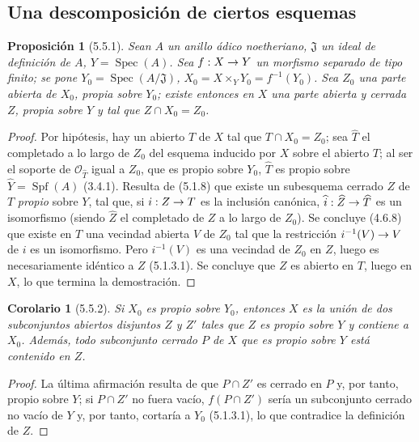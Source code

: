 \documentclass[10pt,oneside,openany]{book}
\theoremstyle{egaenv}\newtheorem*{env}{---}
\theoremstyle{egastatement}
\newtheorem*{proposition}{Proposición}
\newtheorem*{corollary}{Corolario}
\theoremstyle{egadescription}
\renewcommand{\to}{\mathchoice{\longrightarrow}{\rightarrow}{\rightarrow}{\rightarrow}}
\begin{document}
\subsection{Una descomposición de ciertos esquemas}
\label{subsection:III.5.5}
\label{subsection:III.5.5-fr}

\begin{proposition}[5.5.1]
\label{III.5.5.1-fr}
Sean $A$ un anillo ádico noetheriano, $\mathfrak J$ un ideal de definición
de $A$, $Y=\operatorname{Spec}(A)$. Sea $f:X\to Y$ un morfismo separado de
tipo finito; se pone $Y_0=\operatorname{Spec}(A/\mathfrak J)$,
$X_0=X\times_Y Y_0=f^{-1}(Y_0)$. Sea $Z_0$ una parte abierta de $X_0$,
propia sobre $Y_0$; existe entonces en $X$ una parte abierta y cerrada $Z$,
propia sobre $Y$ y tal que $Z\cap X_0=Z_0$.
\end{proposition}

\begin{proof}
Por hipótesis, hay un abierto $T$ de $X$ tal que $T\cap X_0=Z_0$; sea
$\widehat T$ el completado a lo largo de $Z_0$ del esquema inducido por $X$ sobre
el abierto $T$; al ser el soporte de $\mathcal O_{\widehat T}$ igual a $Z_0$, que es
propio sobre $Y_0$, $\widehat T$ es propio sobre
$\widehat Y=\operatorname{Spf}(A)$ (3.4.1). Resulta de (5.1.8) que existe
un subesquema cerrado $Z$ de $T$ \emph{propio} sobre $Y$, tal que, si $i:Z\to T$ es
la inclusión canónica, $\widehat i:\widehat Z\to\widehat T$ es un
isomorfismo (siendo $\widehat Z$ el completado de $Z$ a lo largo de $Z_0$). Se
concluye (4.6.8) que existe en $T$ una vecindad abierta $V$ de $Z_0$ tal que
la restricción $i^{-1}(V)\to V$ de $i$ es un isomorfismo. Pero
$i^{-1}(V)$ es una vecindad de $Z_0$ en $Z$, luego es necesariamente
idéntico a $Z$ (5.1.3.1). Se concluye que $Z$ es abierto en $T$, luego
en $X$, lo que termina la demostración.
\end{proof}

\begin{corollary}[5.5.2]
\label{III.5.5.2}
\label{III.5.5.2-fr}
Si $X_0$ es propio sobre $Y_0$, entonces $X$ es la unión de dos
subconjuntos abiertos disjuntos $Z$ y $Z'$ tales que $Z$ es propio sobre
$Y$ y contiene a $X_0$. Además, todo subconjunto cerrado $P$ de $X$
que es propio sobre $Y$ está contenido en $Z$.
\end{corollary}

\begin{proof}
La última afirmación resulta de que $P\cap Z'$ es cerrado en $P$ y, por tanto, propio
sobre $Y$; si $P\cap Z'$ no fuera vacío, $f(P\cap Z')$ sería un subconjunto cerrado
no vacío de $Y$ y, por tanto, cortaría a $Y_0$ (5.1.3.1), lo que contradice la
definición de $Z$.
\end{proof}
\end{document}
